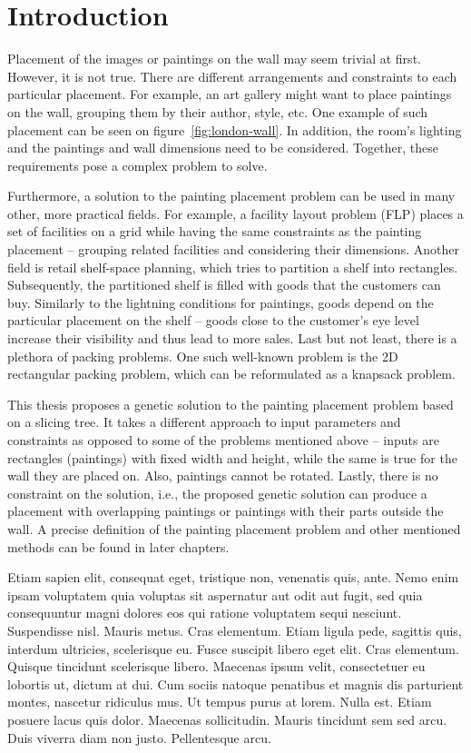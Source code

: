 \chapter{Introduction}\label{ch:introduction}

Placement of the images or paintings on the wall may seem trivial at first.
However, it is not true.
There are different arrangements and constraints to each particular placement.
For example, an art gallery might want to place paintings on the wall, grouping them by their author, style, etc.
One example of such placement can be seen on figure~\ref{fig:london-wall}.
In addition, the room's lighting and the paintings and wall dimensions need to be considered.
Together, these requirements pose a complex problem to solve.

Furthermore, a solution to the painting placement problem can be used in many other, more practical fields.
For example, a facility layout problem (FLP) places a set of facilities on a grid
while having the same constraints as the painting placement – grouping related facilities and considering their dimensions.
Another field is retail shelf-space planning, which tries to partition a shelf into rectangles.
Subsequently, the partitioned shelf is filled with goods that the customers can buy.
Similarly to the lightning conditions for paintings, goods depend on the
particular placement on the shelf – goods close to the customer's eye level increase their visibility and thus lead to more sales.
Last but not least, there is a plethora of packing problems.
One such well-known problem is the 2D rectangular packing problem, which can be reformulated as a knapsack problem.

This thesis proposes a genetic solution to the painting placement problem based on a slicing tree.
It takes a different approach to input parameters and constraints as opposed to some of the
problems mentioned above – inputs are rectangles (paintings) with fixed width and height,
while the same is true for the wall they are placed on. Also, paintings cannot be rotated.
Lastly, there is no constraint on the solution, i.e., the proposed genetic solution can
produce a placement with overlapping paintings or paintings with their parts outside the wall.
A precise definition of the painting placement problem and other mentioned methods can be found in later chapters.

 Etiam sapien elit, consequat eget, tristique non, venenatis quis, ante. Nemo enim ipsam voluptatem quia voluptas sit aspernatur aut odit aut fugit, sed quia consequuntur magni dolores eos qui ratione voluptatem sequi nesciunt. Suspendisse nisl. Mauris metus. Cras elementum. Etiam ligula pede, sagittis quis, interdum ultricies, scelerisque eu. Fusce suscipit libero eget elit. Cras elementum. Quisque tincidunt scelerisque libero. Maecenas ipsum velit, consectetuer eu lobortis ut, dictum at dui. Cum sociis natoque penatibus et magnis dis parturient montes, nascetur ridiculus mus. Ut tempus purus at lorem. Nulla est. Etiam posuere lacus quis dolor. Maecenas sollicitudin. Mauris tincidunt sem sed arcu. Duis viverra diam non justo. Pellentesque arcu.

